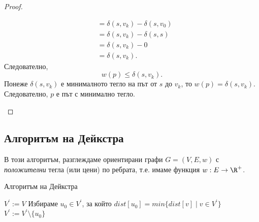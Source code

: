 \begin{proof}
\begin{enumerate}[1)]
\begin{itemize}
\begin{align*}
        & = \delta(s,v_k) - \delta(s,v_0)\\
        & = \delta(s,v_k) - \delta(s,s)\\
        & = \delta(s,v_k) - 0\\
        & = \delta(s,v_k).
      \end{align*}
      Следователно, 
      \[w(p) \leq \delta(s,v_k).\]
      Понеже $\delta(s,v_k)$ е минималното тегло на път от $s$ до $v_k$,
      то $w(p) = \delta(s,v_k)$.
      Следователно, $p$ е път с минимално тегло.
    \end{itemize}
  \end{enumerate}
\end{proof}




\subsection{Алгоритъм на Дейкстра}

В този алгоритъм, разглеждаме ориентирани графи $G = (V,E,w)$ с {\em положителни} тегла (или цени) по ребрата, т.е. 
имаме функция $w:E\to\R^+$. 

\begin{algorithm}
\caption{Алгоритъм на Дейкстра}
\label{alg:dijkstra}

\begin{algorithmic}[1]
  \State {}
  \State $V^\prime := V$
  \State Избираме $u_0\in V^\prime$, за който $ dist[u_0] = min\{dist[v] \mid v\in V^\prime\} $
  \State $V^\prime := V^\prime\setminus\{u_0\}$
  \State{}
  \EndFor
  \EndWhile
  \EndProcedure
\end{algorithmic}
\end{algorithm}

